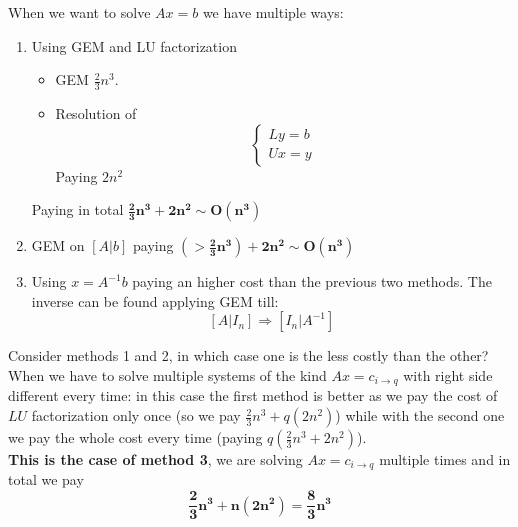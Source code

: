 When we want to solve $Ax=b$ we have multiple ways:
\begin{enumerate}
    \item Using GEM and LU factorization
    \begin{itemize}
        \item GEM $\frac{2}{3}n^3$.
        \item Resolution of
        $$
        \begin{cases}
            Ly=b\\
            Ux=y
        \end{cases}
        $$
        Paying $2n^2$
    \end{itemize}
    Paying in total $\mathbf{\frac{2}{3}n^3+2n^2\sim O(n^3)}$
    \item GEM on $\left[A|b\right]$ paying $\mathbf{(>\frac{2}{3}n^3)+2n^2\sim O(n^3)}$
    \item Using $x=A^{-1}b$ paying an higher cost than the previous two methods. The inverse can be found applying GEM till:
    $$\left[A|I_n\right]\Rightarrow \left[I_n|A^{-1}\right]$$
\end{enumerate}
Consider methods 1 and 2, in which case one is the less costly than the other? When we have to solve multiple systems of the kind $Ax=c_{i\rightarrow q}$ with right side different every time: in this case the first method is better as we pay the cost of $LU$ factorization only once (so we pay $\frac{2}{3}n^3+q(2n^2)$) while with the second one we pay the whole cost every time (paying $q\left(\frac{2}{3}n^3+2n^2\right)$).\\
\textbf{This is the case of method 3}, we are solving $Ax=c_{i\rightarrow q}$   multiple times and in total we pay
$$\mathbf{\frac{2}{3}n^3+n(2n^2)=\frac{8}{3}n^3}$$

